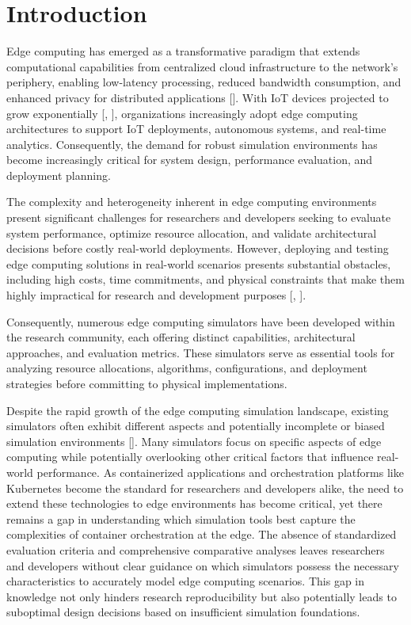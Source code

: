 \chapter{Introduction}
Edge computing has emerged as a transformative paradigm that extends computational capabilities from centralized cloud infrastructure to the network's periphery, 
enabling low-latency processing, reduced bandwidth consumption, and enhanced privacy for distributed applications [\cite{7488250}]. 
With IoT devices projected to grow exponentially [\cite{7488250}, \cite{10258346}], organizations increasingly adopt edge computing architectures to support IoT deployments, 
autonomous systems, and real-time analytics. Consequently, the demand for robust simulation environments has become increasingly critical for system design, performance evaluation, and deployment planning.

The complexity and heterogeneity inherent in edge computing environments present significant challenges for researchers and developers seeking to evaluate system performance, 
optimize resource allocation, and validate architectural decisions before costly real-world deployments. However, 
deploying and testing edge computing solutions in real-world scenarios presents substantial obstacles, including high costs, time commitments, and physical constraints 
that make them highly impractical for research and development purposes [\cite{ASHOURI2021100346}, \cite{7488250}]. 

Consequently, numerous edge computing simulators have been developed within the research community, each offering distinct capabilities, architectural approaches, and evaluation metrics. 
These simulators serve as essential tools for analyzing resource allocations, algorithms, configurations, and deployment strategies before committing to physical implementations.

Despite the rapid growth of the edge computing simulation landscape, existing simulators often exhibit different aspects and potentially incomplete or biased simulation environments [\cite{ASHOURI2021100346}]. 
Many simulators focus on specific aspects of edge computing while potentially overlooking other critical factors that influence real-world performance. 
As containerized applications and orchestration platforms like Kubernetes become the standard for researchers and developers alike, the need to extend these technologies to edge environments has become critical, 
yet there remains a gap in understanding which simulation tools best capture the complexities of container orchestration at the edge. The absence of standardized evaluation criteria and comprehensive comparative 
analyses leaves researchers and developers without clear guidance on which simulators possess the necessary characteristics to accurately model edge computing scenarios. This gap in knowledge not only hinders research 
reproducibility but also potentially leads to suboptimal design decisions based on insufficient simulation foundations.

